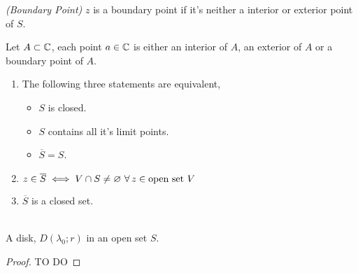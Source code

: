 \documentclass{article}
\begin{document}
\begin{ndefi}{\textit{(Boundary Point)}}
  $z$ is a boundary point if it's neither a interior or exterior point of $S$.
\end{ndefi}

\begin{nlemma}
  Let $A\subset \mathbb{C}$, each point $a\in\mathbb{C}$ is either an interior of $A$, an exterior of $A$ or a boundary point of $A$.
\end{nlemma}

\begin{minipage}{.5\textwidth}
    \centering
    \begin{nprop}
      \begin{enumerate}
        \item The following three statements are equivalent, \begin{itemize}
          \item $S$ is closed.
          \item $S$ contains all it's limit points.
          \item $\overline S = S$.
      \end{itemize}
      \item $z\in\overline S \iff V \cap S \ne \varnothing\,\, \forall\, z \in \text{open set } V$
      \item $\overline S$ is a closed set.
      \end{enumerate}
    \end{nprop}
\end{minipage}%
\begin{minipage}{0.5\textwidth}
    \centering
    \\\vspace{25pt}
    {\hspace{20pt} A disk, $D(\lambda_0; r)$ in an open set $S$.}
\end{minipage}

\vspace{10pt}
\begin{proof}
  TO DO
\end{proof}
\end{document}
